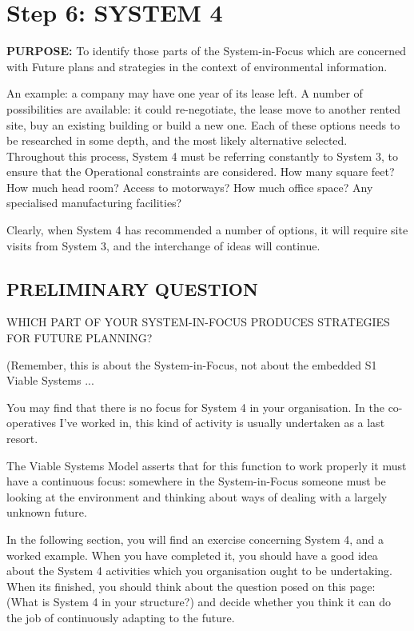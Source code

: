 \section*{Step 6: SYSTEM 4}
\textbf{PURPOSE:} To identify those parts of the System-in-Focus which are concerned with Future plans and strategies in the context of environmental information.

An example: a company may have one year of its lease left. A number of possibilities are available: it could re-negotiate, the lease move to another rented site, buy an existing building or build a new one. Each of these options needs to be researched in some depth, and the most likely alternative selected. Throughout this process, System 4 must be referring constantly to System 3, to ensure that the Operational constraints are considered. How many square feet? How much head room? Access to motorways? How much office space? Any specialised manufacturing facilities?

Clearly, when System 4 has recommended a number of options, it will require site visits from System 3, and the interchange of ideas will continue.

\subsection*{PRELIMINARY QUESTION}
WHICH PART OF YOUR SYSTEM-IN-FOCUS PRODUCES STRATEGIES FOR FUTURE PLANNING?

(Remember, this is about the System-in-Focus, not about the embedded S1 Viable Systems ...

You may find that there is no focus for System 4 in your organisation. In the co-operatives I've worked in, this kind of activity is usually undertaken as a last resort.

The Viable Systems Model asserts that for this function to work properly it must have a continuous focus: somewhere in the System-in-Focus someone must be looking at the environment and thinking about ways of dealing with a largely unknown future.

In the following section, you will find an exercise concerning System 4, and a worked example. When you have completed it, you should have a good idea about the System 4 activities which you organisation ought to be undertaking. When its finished, you should think about the question posed on this page: (What is System 4 in your structure?) and decide whether you think it can do the job of continuously adapting to the future.

